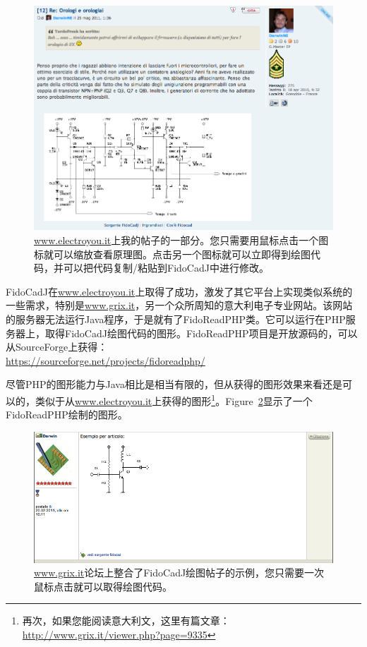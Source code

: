\documentclass[10pt,a4paper,twoside]{scrreprt}
\begin{document}
\begin{figure}
\includegraphics[width=\textwidth]{discussione_electroyou.png}
\caption{\href{www.electroyou.it}{www.electroyou.it}上我的帖子的一部分。您只需要用鼠标点击一个图标就可以缩放查看原理图。点击另一个图标就可以立即得到绘图代码，并可以把代码复制/粘贴到FidoCadJ中进行修改。}
\label{fig_discussione_electroyou}
\end{figure}

FidoCadJ在\href{www.electroyou.it}{www.electroyou.it}上取得了成功，激发了其它平台上实现类似系统的一些需求，特别是\href{www.grix.it}{www.grix.it}，另一个众所周知的意大利电子专业网站。该网站的服务器无法运行Java程序，于是就有了FidoReadPHP类。它可以运行在PHP服务器上，取得FidoCadJ绘图代码的图形。FidoReadPHP项目是开放源码的，可以从SourceForge上获得：\\ \href{https://sourceforge.net/projects/fidoreadphp/}{https://sourceforge.net/projects/fidoreadphp/}

尽管PHP的图形能力与Java相比是相当有限的，但从获得的图形效果来看还是可以的，类似于从\href{www.electroyou.it}{www.electroyou.it}上获得的图形\footnote{再次，如果您能阅读意大利文，这里有篇文章：\\ \href{http://www.grix.it/viewer.php?page=9335}{http://www.grix.it/viewer.php?page=9335}}。Figure~\ref{fig_fidocadj_grix3}显示了一个FidoReadPHP绘制的图形。

\begin{figure}
\includegraphics[width=\textwidth]{fidocadj_grix3.png}
\caption{\href{www.grix.it}{www.grix.it}论坛上整合了FidoCadJ绘图帖子的示例，您只需要一次鼠标点击就可以取得绘图代码。}
\label{fig_fidocadj_grix3}
\end{figure}
\end{document}
